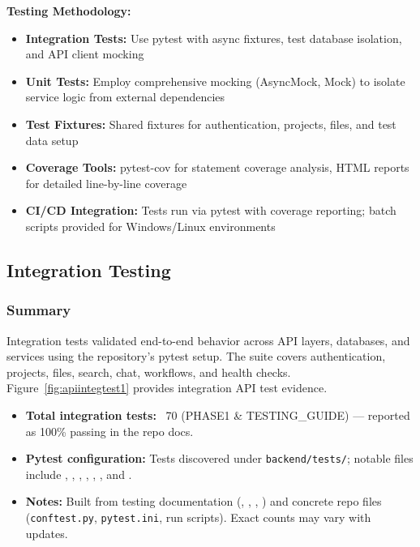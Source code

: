 \textbf{Testing Methodology:}

\begin{itemize}
    \item \textbf{Integration Tests:} Use pytest with async fixtures, test database isolation, and API client mocking
    \item \textbf{Unit Tests:} Employ comprehensive mocking (AsyncMock, Mock) to isolate service logic from external dependencies
    \item \textbf{Test Fixtures:} Shared fixtures for authentication, projects, files, and test data setup
    \item \textbf{Coverage Tools:} pytest-cov for statement coverage analysis, HTML reports for detailed line-by-line coverage
    \item \textbf{CI/CD Integration:} Tests run via pytest with coverage reporting; batch scripts provided for Windows/Linux environments
\end{itemize}

\subsection{Integration Testing}
\label{subsec:integration-testing}

\subsubsection{Summary}

Integration tests validated end-to-end behavior across API layers, databases, and services using the repository's pytest setup. The suite covers authentication, projects, files, search, chat, workflows, and health checks.
Figure~\ref{fig:apiintegtest1} provides integration API test evidence.

\begin{itemize}
    \item \textbf{Total integration tests:} ~70 (PHASE1 \& TESTING\_GUIDE) — reported as 100\% passing in the repo docs.
    \item \textbf{Pytest configuration:} Tests discovered under \texttt{backend/tests/}; notable files include \texttt{}, \texttt{}, \texttt{}, \texttt{}, \texttt{}, \texttt{}, and \texttt{}.
    \item \textbf{Notes:} Built from testing documentation (\texttt{}, \texttt{}, \texttt{}, \texttt{}) and concrete repo files (\texttt{conftest.py}, \texttt{pytest.ini}, run scripts). Exact counts may vary with updates.
\end{itemize}

